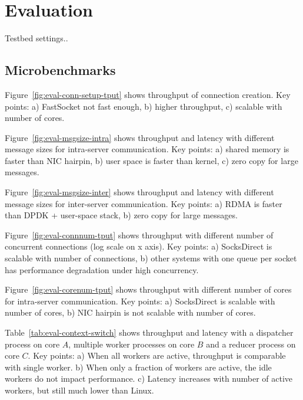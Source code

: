 \section{Evaluation}
\label{sec:evaluation}

Testbed settings..

\subsection{Microbenchmarks}

Figure~\ref{fig:eval-conn-setup-tput} shows throughput of connection creation. Key points: a) FastSocket not fast enough, b) higher throughput, c) scalable with number of cores.

Figure~\ref{fig:eval-msgsize-intra} shows throughput and latency with different message sizes for intra-server communication. Key points: a) shared memory is faster than NIC hairpin, b) user space is faster than kernel, c) zero copy for large messages.

Figure~\ref{fig:eval-msgsize-inter} shows throughput and latency with different message sizes for inter-server communication. Key points: a) RDMA is faster than DPDK + user-space stack, b) zero copy for large messages.

Figure~\ref{fig:eval-connnum-tput} shows throughput with different number of concurrent connections (log scale on x axis). Key points: a) SocksDirect is scalable with number of connections, b) other systems with one queue per socket has performance degradation under high concurrency.

Figure~\ref{fig:eval-corenum-tput} shows throughput with different number of cores for intra-server communication. Key points: a) SocksDirect is scalable with number of cores, b) NIC hairpin is not scalable with number of cores.

Table~\ref{tab:eval-context-switch} shows throughput and latency with a dispatcher process on core $A$, multiple worker processes on core $B$ and a reducer process on core $C$. Key points: a) When all workers are active, throughput is comparable with single worker. b) When only a fraction of workers are active, the idle workers do not impact performance. c) Latency increases with number of active workers, but still much lower than Linux.


